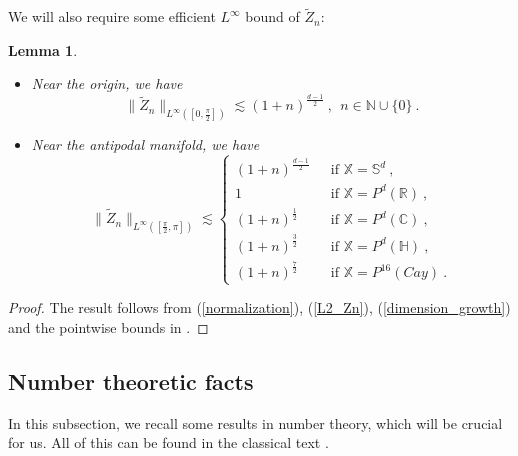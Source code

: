\documentclass[12pt]{amsart}
\newtheorem{lemma}[theorem]{Lemma}
\theoremstyle{definition}
\newcommand{\R}{\mathbb R}%
\newcommand{\C}{\mathbb C}%
\newcommand{\N}{\mathbb N}%
\newcommand{\Sb}{\mathbb S}%
\newcommand{\X}{\mathbb X}%
\newcommand{\Hb}{\mathbb H}%
\numberwithin{equation}{section}
\begin{document}
We will also require some efficient $L^\infty$ bound of $\tilde{Z}_n$:
\begin{lemma} \label{Linfty_bound}
\begin{itemize}
\item[(i)] Near the origin, we have
 \begin{equation*}
 \|\tilde{Z}_n\|_{L^\infty\left(\left[0,\frac{\pi}{2}\right]\right)} \lesssim {\left(1+n\right)}^{\frac{d-1}{2}}\:,\:\: n \in \N \cup \{0\}\:.
\end{equation*}  
\item[(ii)] Near the antipodal manifold, we have
\begin{equation*}
\|\tilde{Z}_n\|_{L^\infty\left(\left[\frac{\pi}{2},\pi\right]\right)} \lesssim \begin{cases}
(1+n)^{\frac{d-1}{2}}\:\:\:&\text{if } \X=\Sb^d\:,\\
1\:\:\:&\text{if } \X=P^d(\R)\:,\\
(1+n)^{\frac{1}{2}}\:\:\:&\text{if } \X=P^d(\C)\:,\\
(1+n)^{\frac{3}{2}}\:\:\:&\text{if } \X=P^d(\Hb)\:,\\
(1+n)^{\frac{7}{2}}\:\:\:&\text{if } \X=P^{16}(Cay)\:.
\end{cases}
\end{equation*}
\end{itemize}
\end{lemma}
\begin{proof}
The result follows from (\ref{normalization}), (\ref{L2_Zn}), (\ref{dimension_growth}) and the pointwise bounds in \cite[Lemma 7]{CT}.
\end{proof}



\subsection{Number theoretic facts}
In this subsection, we recall some results in number theory, which will be crucial for us. All of this can be found in the classical text \cite{Hardy}.
\end{document}
